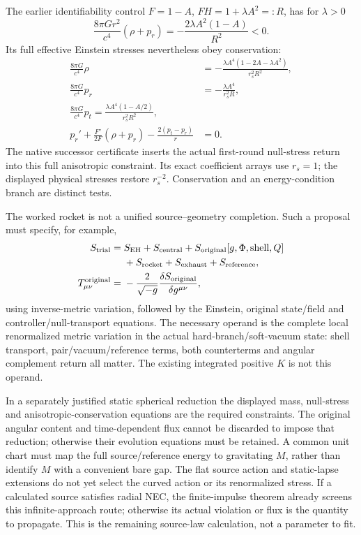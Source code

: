 \documentclass[10pt,twocolumn,letterpaper]{article}
\begin{document}
The earlier identifiability control $F=1-A$,
$FH=1+\lambda A^2=:R$, has for $\lambda>0$
\begin{equation}
 \frac{8\pi Gr^2}{c^4}(\rho+p_r)
       =-\frac{2\lambda A^2(1-A)}{R^2}<0 .
\end{equation}
Its full effective Einstein stresses nevertheless obey conservation:
\begin{equation}
 \begin{split}
 \frac{8\pi G}{c^4}\rho
    &=-\frac{\lambda A^4(1-2A-\lambda A^2)}{r_s^2R^2},\\
 \frac{8\pi G}{c^4}p_r&=-\frac{\lambda A^4}{r_s^2R},\\
 \frac{8\pi G}{c^4}p_t=\frac{\lambda A^4(1-A/2)}{r_s^2R^2},\\
 p_r'+\frac{F'}{2F}(\rho+p_r)-\frac{2(p_t-p_r)}r&=0 .
 \end{split}
\end{equation}
The native successor certificate inserts the actual first-round
null-stress return into this full anisotropic constraint. Its exact
coefficient arrays use $r_s=1$; the displayed physical stresses restore
$r_s^{-2}$. Conservation and an energy-condition branch are distinct tests.

The worked rocket is not a unified source--geometry completion. Such a
proposal must specify, for example,
\begin{equation}
 \begin{split}
 S_{\rm trial}={}&S_{\rm EH}+S_{\rm central}
     +S_{\rm original}[g,\Phi,\mathrm{shell},Q]\\
     &+S_{\rm rocket}+S_{\rm exhaust}+S_{\rm reference},\\
 T^{\rm original}_{\mu\nu}
    ={}&-\frac{2}{\sqrt{-g}}
            \frac{\delta S_{\rm original}}{\delta g^{\mu\nu}},
 \end{split}
\end{equation}
using inverse-metric variation, followed by the
Einstein, original state/field and controller/null-transport equations.
The necessary operand is the complete local renormalized metric
variation in the actual hard-branch/soft-vacuum state: shell transport,
pair/vacuum/reference terms, both counterterms and angular complement
return all matter. The existing integrated positive $K$ is not this operand.

In a separately justified static spherical reduction the displayed mass,
null-stress and anisotropic-conservation equations are the required
constraints. The original angular content and time-dependent flux cannot
be discarded to impose that reduction; otherwise their evolution
equations must be retained. A common unit chart must map the full
source/reference energy to gravitating $M$, rather than identify $M$
with a convenient bare gap. The flat source action and static-lapse
extensions do not yet select the curved action or its renormalized
stress. If a calculated source satisfies radial NEC, the finite-impulse
theorem already screens this infinite-approach route; otherwise its
actual violation or flux is the quantity to propagate. This is the
remaining source-law calculation, not a parameter to fit.
\end{document}
